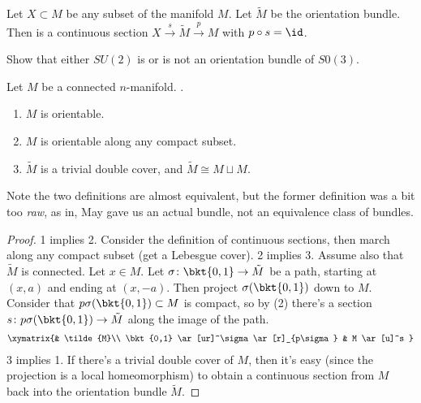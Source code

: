 \begin{defn}
    \label{defn:orientation_bredon_}
    Let $X \subset M$ be any subset of the manifold $M$. Let $\tilde{M}$ be the orientation bundle. Then  is a continuous section 
    $X \xrightarrow{s} \tilde{M} \xrightarrow{p} M$ with $p \circ s = \id$.
\end{defn}

\begin{todo}[$SU(2)$ is a cover of $SO(3)$]
    \label{todo:_su_2_is_a_cover_of_so_3_}
    Show that either $SU(2)$ is or is not an orientation bundle of $S0(3)$. 
\end{todo}

\begin{prop}
    \label{prop:sufficient_conditions_for_orientability}
    Let $M$ be a connected $n$-manifold. \TFAE.
    \begin{enumerate}
        \item $M$ is orientable.
            \item $M$ is orientable along any compact subset. 
            \item $\tilde{M}$ is a trivial double cover, and $\tilde{M} \cong M \sqcup M$.
    \end{enumerate}
\end{prop}

Note the two definitions are almost equivalent, but the former definition was a bit too \emph{raw}, as in, May gave us an actual bundle, not an equivalence class of bundles.

\begin{proof}
    1 implies 2. Consider the definition of continuous sections, then march along any compact subset (get a Lebesgue cover).
    2 implies 3. Assume also that $\tilde{M}$ is connected. Let $x \in M$.  Let $\sigma \colon \bkt{0,1} \to \tilde{M}$ be a path, starting at $(x,a)$ and ending at $(x,-a)$. Then project $\sigma(\bkt{0,1})$ down to $M$. Consider that $p\sigma (\bkt{0,1}) \subset M$ is compact, so by (2) there's a section $s \colon p\sigma (\bkt{0,1}) \to \tilde{M}$ along the image of the path.
    \begin{equation*}
    \begin{gathered}\xymatrix{%
            & \tilde{M}\\
        \bkt{0,1} \ar[ur]^\sigma \ar[r]_{p\sigma} & M \ar[u]^s
        }
    \end{gathered}
    \end{equation*}
    3 implies 1. If there's a trivial double cover of $M$, then it's easy (since the projection is a local homeomorphism) to obtain a continuous section from $M$ back into the orientation bundle $\tilde{M}$.
\end{proof}


